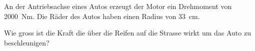 \begin{aufgabe}
	An der Antriebsachse eines Autos erzeugt der Motor ein Drehmoment von \SI{2000}{Nm}.
	Die Räder des Autos haben einen Radius von \SI{33}{cm}.

	Wie gross ist die Kraft die über die Reifen auf die Strasse wirkt um das Auto zu beschleunigen?

\end{aufgabe}
